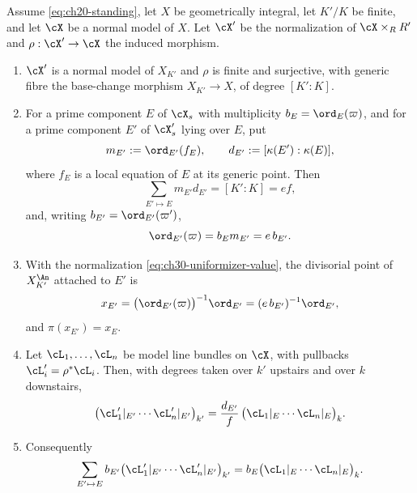 \begin{lemma}
\label{lem:ch30-base-change-model}
Assume \eqref{eq:ch20-standing}, let $X$ be geometrically integral, let
$K'/K$ be finite, and let $\cX$ be a normal model of $X$.  Let
$\cX'$ be the normalization of $\cX\times_RR'$ and
$\rho:\cX'\to\cX$ the induced morphism.
\begin{enumerate}
\item\label{itm:ch30-bcmod:finite}
$\cX'$ is a normal model of $X_{K'}$ and $\rho$ is finite and
surjective, with generic fibre the base-change morphism
$X_{K'}\to X$, of degree $[K':K]$.
\item\label{itm:ch30-bcmod:mult}
For a prime component $E$ of $\cX_s$ with multiplicity
$b_E=\ord_E(\varpi)$, and for a prime component $E'$ of $\cX'_s$
lying over $E$, put
\[
 m_{E'}:=\ord_{E'}(f_E),
 \qquad
 d_{E'}:=[\kappa(E'):\kappa(E)],
\]
where $f_E$ is a local equation of $E$ at its generic point.  Then
\begin{equation}
\label{eq:ch30-ramification-sum}
 \sum_{E'\mapsto E}m_{E'}d_{E'}=[K':K]=ef,
\end{equation}
and, writing $b_{E'}=\ord_{E'}(\varpi')$,
\begin{equation}
\label{eq:ch30-multiplicity-relation}
 \ord_{E'}(\varpi)=b_Em_{E'}=e\,b_{E'} .
\end{equation}
\item\label{itm:ch30-bcmod:points}
With the normalization \eqref{eq:ch30-uniformizer-value}, the divisorial
point of $X_{K'}^{\An}$ attached to $E'$ is
\[
 x_{E'}=\bigl(\ord_{E'}(\varpi)\bigr)^{-1}\ord_{E'}
       =(e\,b_{E'})^{-1}\ord_{E'},
\]
and $\pi(x_{E'})=x_E$.
\item\label{itm:ch30-bcmod:degrees}
Let $\cL_1,\ldots,\cL_n$ be model line bundles on $\cX$, with pullbacks
$\cL'_i=\rho^*\cL_i$.  Then, with degrees taken over $k'$ upstairs and
over $k$ downstairs,
\begin{equation}
\label{eq:ch30-degree-transfer}
 \bigl(\cL'_1|_{E'}\cdots\cL'_n|_{E'}\bigr)_{k'}
 =\frac{d_{E'}}{f}\,\bigl(\cL_1|_E\cdots\cL_n|_E\bigr)_{k} .
\end{equation}
\item\label{itm:ch30-bcmod:cancel}
Consequently
\begin{equation}
\label{eq:ch30-coefficient-cancellation}
 \sum_{E'\mapsto E}
   b_{E'}\bigl(\cL'_1|_{E'}\cdots\cL'_n|_{E'}\bigr)_{k'}
 =b_E\bigl(\cL_1|_E\cdots\cL_n|_E\bigr)_{k}.
\end{equation}
\end{enumerate}
\end{lemma}

